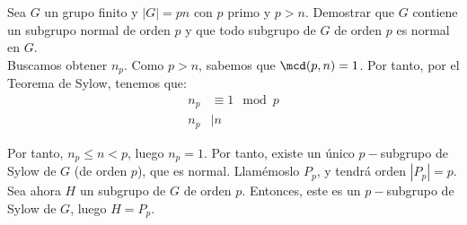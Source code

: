 \begin{ejercicio}\label{ej:6.15}
    Sea $G$ un grupo finito y $|G| = pn$ con $p$ primo y $p > n$. Demostrar que $G$ contiene un subgrupo normal de orden $p$ y que todo subgrupo de $G$ de orden $p$ es normal en $G$.\\

    Buscamos obtener $n_p$. Como $p>n$, sabemos que $\mcd(p,n)=1$. Por tanto, por el Teorema de Sylow, tenemos que:
    \begin{align*}
        n_p &\equiv 1 \mod p \\
        n_p &\mid n
    \end{align*}

    Por tanto, $n_p\leq n<p$, luego $n_p=1$. Por tanto, existe un único $p-$subgrupo de Sylow de $G$ (de orden $p$), que es normal. Llamémoslo $P_p$, y tendrá orden $|P_p|=p$.\\

    Sea ahora $H$ un subgrupo de $G$ de orden $p$. Entonces, este es un $p-$subgrupo de Sylow de $G$, luego $H=P_p$.
\end{ejercicio}


